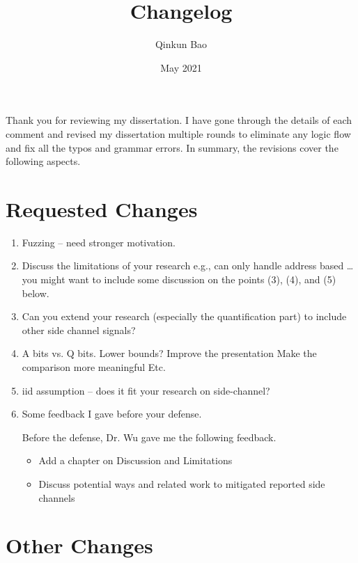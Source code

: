 \documentclass{article}
\title{Changelog}
\author{Qinkun Bao}
\date{May 2021}
\begin{document}
\maketitle
Thank you for reviewing my dissertation. I have gone through the details of each comment and revised my dissertation multiple rounds to eliminate any logic flow and fix all the typos and grammar errors. In summary, the revisions cover the following aspects.

\section{Requested Changes}

\begin{enumerate}
\item Fuzzing – need stronger motivation.
\item Discuss the limitations of your research
e.g., can only handle address based …
you might want to include some discussion on the points (3), (4), and (5) below.
\item Can you extend your research (especially the quantification part) to include other side channel signals?
\item A bits vs. Q bits. Lower bounds?
       Improve the presentation
       Make the comparison more meaningful
       Etc.
\item iid assumption – does it fit your research on side-channel?
\item Some feedback I gave before your defense.

Before the defense, Dr. Wu gave me the following feedback.
\begin{itemize}
\item Add a chapter on Discussion and Limitations
\item Discuss potential ways and related work to mitigated reported side channels
\end{itemize}

\end{enumerate}
\section{Other Changes}
\end{document}
